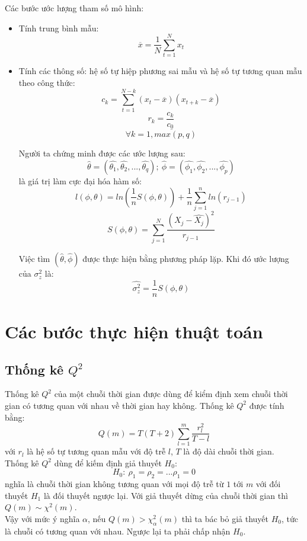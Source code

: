 \documentclass[a4paper, 12pt]{article}
\theoremstyle{plain}
\theoremstyle{definition}
\numberwithin{equation}{section}
\begin{document}
Các bước ước lượng tham số mô hình:\\
\begin{itemize}
	\item Tính trung bình mẫu:
	$$\overline{x} = \frac{1}{N}\sum_{t=1}^{N}x_t$$
	\item Tính các thông số: hệ số tự hiệp phương sai mẫu và hệ số tự tương quan mẫu theo công thức:
 	$$ {c_k} = \sum_{t = 1}^{N-k}(x_t - \overline{x})(x_{t+k} - \overline{x})$$ 
	$$ r_k = \frac{c_k}{c_0}$$
	$$\forall k = \overline{1, max(p, q)}$$

Người ta chứng minh được các ước lượng sau:
	$$\hat{\theta} = (\hat{\theta_1}, \hat{\theta_2}, ..., \hat{\theta_q}); \ \hat{\phi} = (\hat{\phi_1}, \hat{\phi_2}, ..., \hat{\phi_p}) $$
là giá trị làm cực đại hóa hàm số:
	$$l(\phi, \theta) = ln(\frac{1}{n}S(\phi,\theta)) + \frac{1}{n}\sum_{j=1}^{n}ln(r_{j-1})$$
	$$S(\phi, \theta) = \sum_{j=1}^{N}\frac{(X_j - \hat{X_j})^2}{r_{j-1}}$$
	
Việc tìm $(\hat{\theta}, \hat{\phi})$ được thực hiện bằng phương pháp lặp. Khi đó ước lượng của $\sigma_z^2$ là: 
	$$\hat{\sigma_z^2} = \frac{1}{n}S(\phi,\theta)$$
\end{itemize}
\section{Các bước thực hiện thuật toán}
\subsection{Thống kê $Q^2$}
Thống kê $Q^2$ của một chuỗi thời gian được dùng để kiểm định xem chuỗi thời gian có tương quan với nhau về thời gian hay không. Thống kê $Q^2$ được tính bằng:
$$Q(m) = T(T+2)\sum_{l = 1}^{m}\frac{r^2_l}{T-l}$$
với $r_l$ là hệ số tự tương quan mẫu với độ trễ $l$, $T$ là độ dài chuỗi thời gian. \\
Thống kê $Q^2$ dùng để kiếm định giả thuyết $H_0$: 
$$H_0: \ \rho_1 = \rho_2 = ... \rho_1 = 0$$
nghĩa là chuỗi thời gian không tương quan với mọi độ trễ từ $1$ tới $m$ với đối thuyết $H_1$ là đối thuyết ngược lại.
Với giả thuyết dừng của chuỗi thời gian thì $Q(m) \sim \chi^2(m)$.\\
Vậy với mức ý nghĩa $\alpha$, nếu $Q(m) > \chi^2_\alpha(m)$ thì ta bác bỏ giả thuyết $H_0$, tức là chuỗi có tương quan với nhau. Ngược lại ta phải chấp nhận $H_0$. 
\end{document}
